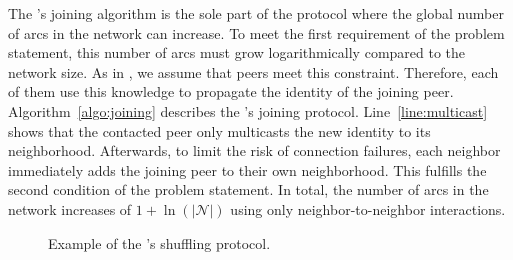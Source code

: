 
The \SPRAY's joining algorithm is the sole part of the protocol where the
global number of arcs in the network can increase. To meet the first
requirement of the problem statement, this number of arcs must grow
logarithmically compared to the network size. As in \SCAMP, we assume that
peers meet this constraint. Therefore, each of them use this knowledge to
propagate the identity of the joining peer. Algorithm~\ref{algo:joining}
describes the \SPRAY's joining protocol. Line~\ref{line:multicast} shows that
the contacted peer only multicasts the new identity to its
neighborhood. Afterwards, to limit the risk of connection failures, each
neighbor immediately adds the joining peer to their own neighborhood. This
fulfills the second condition of the problem statement.  In total, the number
of arcs in the network increases of $1+\ln(|\mathcal{N}|)$ using only
neighbor-to-neighbor interactions.

\begin{figure*}
  \centering
  \hspace{10pt}
  \hspace{10pt}
  \caption{\label{fig:cyclicexample}Example of the \SPRAY's shuffling
    protocol. }
\end{figure*}

